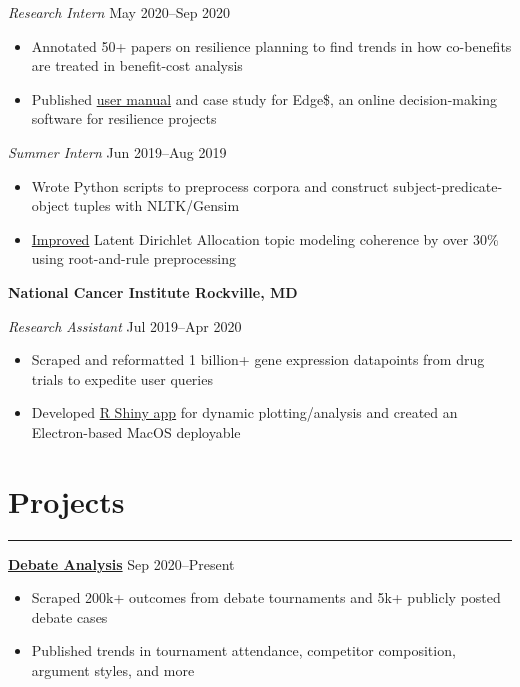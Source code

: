 \documentclass[11pt]{article}
\newcommand{\resumesection}[1]{\vspace{-0.6cm}\section*{\color{highlight}#1}\vspace{-0.3cm}\hrule\vspace{0.2cm}}
\begin{document}
\textit{Research Intern} \hfill May 2020--Sep 2020
\begin{itemize}
	\item Annotated 50+ papers on resilience planning to find trends in how co-benefits are treated in benefit-cost analysis
	\item Published \href{https://nvlpubs.nist.gov/nistpubs/SpecialPublications/NIST.SP.1260.pdf}{user manual} and case study for Edge\$, an online decision-making software for resilience projects
\end{itemize}\par

\textit{Summer Intern} \hfill Jun 2019--Aug 2019
\begin{itemize}
	\item Wrote Python scripts to preprocess corpora and construct subject-predicate-object tuples with NLTK/Gensim
	\item \href{https://github.com/petezh/RR-NLP-Tools}{Improved} Latent Dirichlet Allocation topic modeling coherence by over 30\% using root-and-rule preprocessing
\end{itemize}\vspace{0.1cm}

\textbf{National Cancer Institute \hfill Rockville, MD}\par

\textit{Research Assistant} \hfill Jul 2019--Apr 2020 \par
\begin{itemize}
	\item Scraped and reformatted 1 billion+ gene expression datapoints from drug trials to expedite user queries
	\item Developed \href{https://github.com/petezh/TP-Workbench}{R Shiny app} for dynamic plotting/analysis and created an Electron-based MacOS deployable
\end{itemize}

\resumesection{Projects}

\textbf{\href{https://github.com/petezh/E-Debate}{Debate Analysis}} \hfill Sep 2020--Present\par
\begin{itemize}
	\item Scraped 200k+ outcomes from debate tournaments and 5k+ publicly posted debate cases
	\item Published trends in tournament attendance, competitor composition, argument styles, and more
\end{itemize}\vspace{0.1cm} \par
\end{document}
